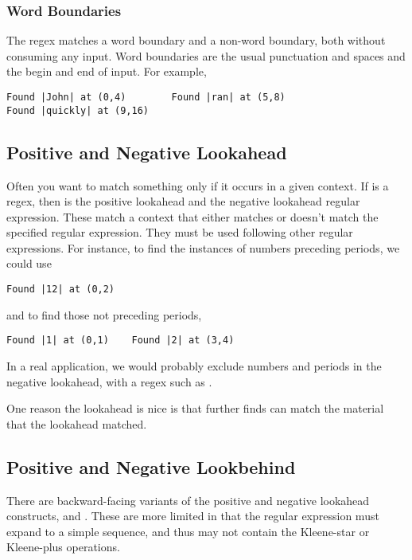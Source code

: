 \subsubsection{Word Boundaries}

The regex  matches a word boundary and  a
non-word boundary, both without consuming any input.  Word boundaries
are the usual punctuation and spaces and the begin and end of input.
For example,
%
\begin{verbatim}
Found |John| at (0,4)        Found |ran| at (5,8)    
Found |quickly| at (9,16)
\end{verbatim}


\subsection{Positive and Negative Lookahead}

Often you want to match something only if it occurs in a given
context.  If  is a regex, then  is
the positive lookahead and  the negative
lookahead regular expression.  These match a context that either
matches or doesn't match the specified regular expression.  They
must be used following other regular expressions.  For instance,
to find the instances of numbers preceding periods, we could
use 
%
\begin{verbatim}
Found |12| at (0,2)
\end{verbatim}
%
and to find those not preceding periods, 
%
\begin{verbatim}
Found |1| at (0,1)    Found |2| at (3,4)
\end{verbatim}
%
In a real application, we would probably exclude numbers and periods
in the negative lookahead, with a regex such as
.

One reason the lookahead is nice is that further finds can match
the material that the lookahead matched.

\subsection{Positive and Negative Lookbehind}

There are backward-facing variants of the positive and negative
lookahead constructs,  and 
.  These are more limited in that the
regular expression  must expand to a simple sequence, and
thus may not contain the Kleene-star or Kleene-plus operations.

